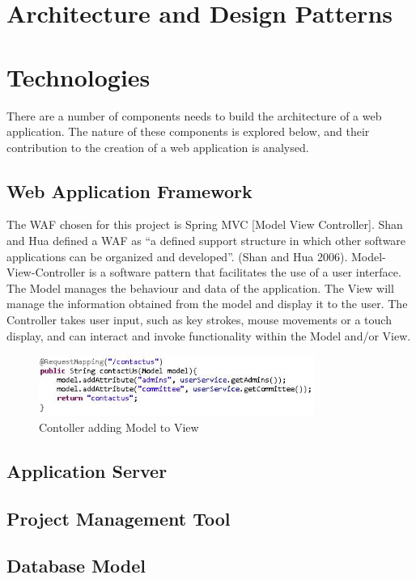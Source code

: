 \section{Architecture and Design Patterns}

\section{Technologies}

There are a number of components needs to build the architecture of a web application. The nature of these components is explored below, and their contribution to the creation of a web application is analysed.

\subsection{Web Application Framework}
The WAF chosen for this project is Spring MVC [Model View Controller]. Shan and Hua defined a WAF as “a defined support structure in which other software applications can be organized and developed”. (Shan and Hua 2006). Model-View-Controller is a software pattern that facilitates the use of a user interface. The Model manages the behaviour and data of the application. The View will manage the information obtained from the model and display it to the user. The Controller takes user input, such as key strokes, mouse movements or a touch display, and can interact and invoke functionality within the Model and/or View.

\begin{figure}[ht!]
\centering
\includegraphics[width=90mm]{figs/fig3-4-1.jpg}
\caption{Contoller adding Model to View}
\label{overflow}
\end{figure}


\subsection{Application Server}

\subsection{Project Management Tool}

\subsection{Database Model}

